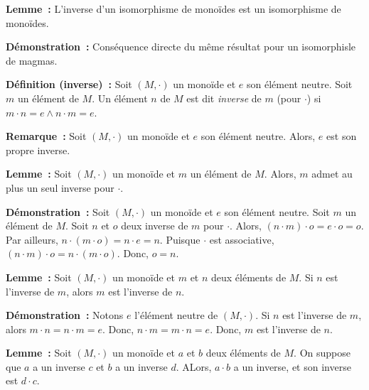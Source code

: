 \medskip

\noindent\textbf{Lemme :} L'inverse d'un isomorphisme de monoïdes est un isomorphisme de monoïdes.

\medskip

\noindent\textbf{Démonstration :} Conséquence directe du même résultat pour un isomorphisle de magmas.

\medskip

\noindent\textbf{Définition (inverse) :} Soit $(M,\cdot)$ un monoïde et $e$ son élément neutre. 
    Soit $m$ un élément de $M$. 
    Un élément $n$ de $M$ est dit \textit{inverse} de $m$ (pour $\cdot$) si $m \cdot n = e \wedge  n \cdot m = e$.

\medskip

\noindent\textbf{Remarque :} Soit $(M,\cdot)$ un monoïde et $e$ son élément neutre.
    Alors, $e$ est son propre inverse.
    
\medskip

\noindent\textbf{Lemme :} Soit $(M,\cdot)$ un monoïde et $m$ un élément de $M$.
    Alors, $m$ admet au plus un seul inverse pour $\cdot$.

\medskip

\noindent\textbf{Démonstration :} Soit $(M,\cdot)$ un monoïde et $e$ son élément neutre. 
    Soit $m$ un élément de $M$. 
    Soit $n$ et $o$ deux inverse de $m$ pour $\cdot$. 
    Alors, $(n \cdot m) \cdot o = e \cdot o = o$.
    Par ailleurs, $n \cdot (m \cdot o) = n \cdot e = n$.
    Puisque $\cdot$ est associative, $(n \cdot m) \cdot o = n \cdot (m \cdot o)$. 
    Donc, $o = n$.

    \hfill \square

\medskip

\noindent\textbf{Lemme :} Soit $(M,\cdot)$ un monoïde et $m$ et $n$ deux éléments de $M$.
    Si $n$ est l'inverse de $m$, alors $m$ est l'inverse de $n$.

\medskip

\noindent\textbf{Démonstration :} 
    Notons $e$ l'élément neutre de $(M, \cdot)$.
    Si $n$ est l'inverse de $m$, alors $m \cdot n = n \cdot m = e$.
    Donc, $n \cdot m = m \cdot n = e$.
    Donc, $m$ est l'inverse de $n$.

    \done

\medskip

\noindent\textbf{Lemme :} Soit $(M,\cdot)$ un monoïde et $a$ et $b$ deux éléments de $M$.
    On suppose que $a$ a un inverse $c$ et $b$ a un inverse $d$. 
    ALors, $a \cdot b$ a un inverse, et son inverse est $d \cdot c$.

